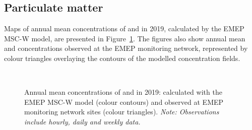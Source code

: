 \subsection{Particulate matter} 
\label{subs:PMstatus}

Maps of annual mean concentrations of \PM[10] and \PM[2.5] in 2019,
calculated by the EMEP MSC-W model, are presented in
Figure~\ref{fig:PMin2018}. The figures also show annual mean \PM[10]
and \PM[2.5] concentrations observed at the EMEP monitoring network,
represented by colour triangles overlaying the contours of the
modelled concentration fields.

\begin{figure}[H]
  \\
  \vspace{0.5cm}
\caption{Annual mean concentrations of \PM[10] and \PM[2.5] in 2019:
  calculated with the EMEP MSC-W model (colour contours) and observed
  at EMEP monitoring network sites (colour triangles). \textit{Note:
    Observations include hourly, daily and weekly data.}}
\label{fig:PMin2018}
\end{figure}


